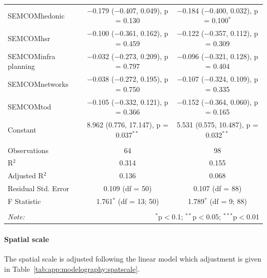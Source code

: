 \documentclass[10pt]{article}
\begin{document}
\begin{table}
\begin{tabular}{@{\extracolsep{5pt}}lcc}
  SEMCOMhedonic & $-$0.179 ($-$0.407, 0.049), p = 0.130 & $-$0.184 ($-$0.400, 0.032), p = 0.100$^{*}$ \\ 
  SEMCOMhsr & $-$0.100 ($-$0.361, 0.162), p = 0.459 & $-$0.122 ($-$0.357, 0.112), p = 0.309 \\
  SEMCOMinfra planning & $-$0.032 ($-$0.273, 0.209), p = 0.797 & $-$0.096 ($-$0.321, 0.128), p = 0.404  \\ 
  SEMCOMnetworks & $-$0.038 ($-$0.272, 0.195), p = 0.750 & $-$0.107 ($-$0.324, 0.109), p = 0.335 \\ 
  SEMCOMtod & $-$0.105 ($-$0.332, 0.121), p = 0.366 & $-$0.152 ($-$0.364, 0.060), p = 0.165 \\ 
  Constant & 8.962 (0.776, 17.147), p = 0.037$^{**}$ & 5.531 (0.575, 10.487), p = 0.032$^{**}$ \\
 \hline \\[-1.8ex] 
Observations & 64 & 98 \\ 
R$^{2}$ & 0.314 & 0.155 \\ 
Adjusted R$^{2}$ & 0.136 & 0.068 \\ 
Residual Std. Error & 0.109 (df = 50) & 0.107 (df = 88) \\ 
F Statistic & 1.761$^{*}$ (df = 13; 50) & 1.789$^{*}$ (df = 9; 88) \\ 
\hline 
\hline \\[-1.8ex] 
\textit{Note:}  & \multicolumn{2}{r}{$^{*}$p$<$0.1; $^{**}$p$<$0.05; $^{***}$p$<$0.01} \\ 
\end{tabular}
\end{table} 

\paragraph{Spatial scale}

The spatial scale is adjusted following the linear model which adjustment is given in Table~\ref{tab:app:modelography:spatscale}.
\end{document}
